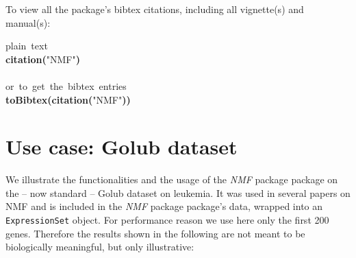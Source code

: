 \documentclass[a4paper]{article}\usepackage{graphicx, color}
\makeatletter
\newcommand{\hlfunctioncall}[1]{\textcolor[rgb]{0.501960784313725,0,0.329411764705882}{\textbf{#1}}}%
\newcommand{\hlstring}[1]{\textcolor[rgb]{0.6,0.6,1}{#1}}%
\newcommand{\hlkeyword}[1]{\textcolor[rgb]{0,0,0}{\textbf{#1}}}%
\newcommand{\hlcomment}[1]{\textcolor[rgb]{0.180392156862745,0.6,0.341176470588235}{#1}}%
\newcommand{\hlstd}[1]{\textcolor[rgb]{0,0,0}{#1}}%
\newenvironment{kframe}{%
 \def\FrameCommand##1{\hskip\@totalleftmargin \hskip-\fboxsep
 \colorbox{shadecolor}{##1}\hskip-\fboxsep
     \hskip-\linewidth \hskip-\@totalleftmargin \hskip\columnwidth}%
 \MakeFramed {\advance\hsize-\width
   \@totalleftmargin\z@ \linewidth\hsize
   \@setminipage}}%
 {\par\unskip\endMakeFramed}
\newenvironment{knitrout}{}{} %
\let\code=\texttt
\newcommand{\pkgname}[1]{\textit{#1}\xspace}
\newcommand{\Rpkg}[1]{\pkgname{#1} package\xspace}
\newcommand{\nmfpack}{\Rpkg{NMF}}
\makeatother
\begin{document}
To view all the package's bibtex citations, including all vignette(s) and manual(s):

\begin{knitrout}
\color{fgcolor}\begin{kframe}
\begin{flushleft}
\ttfamily\noindent
\hlcomment{\usebox{\hlnormalsizeboxhash}{\ }plain{\ }text}\hspace*{\fill}\\
\hlstd{}\hlfunctioncall{citation}\hlkeyword{(}\hlstring{"{}NMF"{}}\hlkeyword{)}\hspace*{\fill}\\
\hlstd{}\hspace*{\fill}\\
\hlstd{}\hlcomment{\usebox{\hlnormalsizeboxhash}{\ }or{\ }to{\ }get{\ }the{\ }bibtex{\ }entries}\hspace*{\fill}\\
\hlstd{}\hlfunctioncall{toBibtex}\hlkeyword{(}\hlfunctioncall{citation}\hlkeyword{(}\hlstring{"{}NMF"{}}\hlkeyword{)}\hlkeyword{)}\mbox{}
\normalfont
\end{flushleft}
\end{kframe}
\end{knitrout}



\section{Use case: Golub dataset}\label{sec:usecase}
We illustrate the functionalities and the usage of the \nmfpack package on the -- now standard -- Golub dataset on leukemia.
It was used in several papers on NMF \cite{Brunet2004, Gao2005} and is included in the \nmfpack package's data, wrapped into an \code{ExpressionSet} object.
 For performance reason we use here only the first 200 genes. 
 Therefore the results shown in the following are not meant to be biologically meaningful, but only illustrative:
\end{document}
